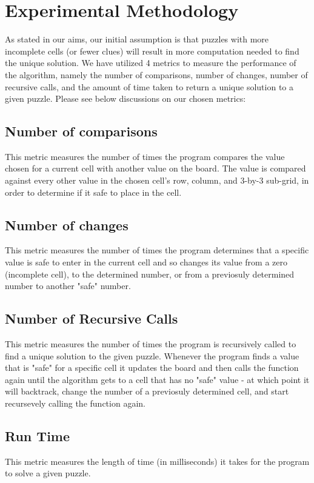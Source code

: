\documentclass{article}
\begin{document}
    \pagebreak 
    \section{Experimental Methodology}
    As stated in our aims, our initial assumption is that puzzles with more incomplete cells (or fewer clues) will result in more computation needed to find the unique solution. We have utilized 4 metrics to measure the performance of the algorithm, namely the number of comparisons, number of changes, number of recursive calls, and the amount of time taken to return a unique solution to a given puzzle. Please see below discussions on our chosen metrics:

    \subsection{Number of comparisons}
    This metric measures the number of times the program compares the value chosen for a current cell with another value on the board. The value is compared against every other value in the chosen cell's row, column, and 3-by-3 sub-grid, in order to determine if it safe to place in the cell.

    \subsection{Number of changes}
    This metric measures the number of times the program determines that a specific value is safe to enter in the current cell and so changes its value from a zero (incomplete cell), to the determined number, or from a previosuly determined number to another "safe" number.
    
    \subsection{Number of Recursive Calls}
    This metric measures the number of times the program is recursively called to find a unique solution to the given puzzle. Whenever the program finds a value that is "safe" for a specific cell it updates the board and then calls the function again until the algorithm gets to a cell that has no "safe" value - at which point it will backtrack, change the number of a previosuly determined cell, and start recursevely calling the function again.

    \subsection{Run Time}   
    This metric measures the length of time (in milliseconds) it takes for the program to solve a given puzzle. 
\end{document}
